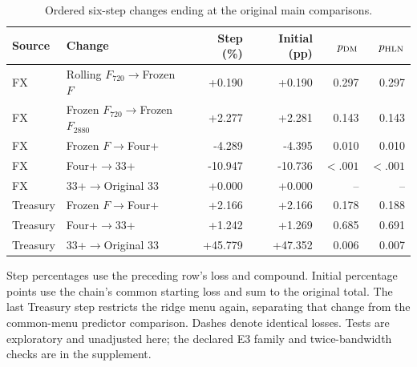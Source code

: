 \begin{table}[!htbp]
\centering\footnotesize
\caption{Ordered six-step changes ending at the original main comparisons.}\label{tab:decomp}
\begin{tabular}{llrrrr}
\toprule
Source & Change & Step (\%) & Initial (pp) & $p_{\rm DM}$ & $p_{\rm HLN}$ \\
\midrule
FX & Rolling $F_{720}$$\to$Frozen $F$ & +0.190 & +0.190 & 0.297 & 0.297 \\
FX & Frozen $F_{720}$$\to$Frozen $F_{2880}$ & +2.277 & +2.281 & 0.143 & 0.143 \\
FX & Frozen $F$$\to$Four+ & -4.289 & -4.395 & 0.010 & 0.010 \\
FX & Four+$\to$33+ & -10.947 & -10.736 & $<.001$ & $<.001$ \\
FX & 33+$\to$Original 33 & +0.000 & +0.000 & -- & -- \\
Treasury & Frozen $F$$\to$Four+ & +2.166 & +2.166 & 0.178 & 0.188 \\
Treasury & Four+$\to$33+ & +1.242 & +1.269 & 0.685 & 0.691 \\
Treasury & 33+$\to$Original 33 & +45.779 & +47.352 & 0.006 & 0.007 \\
\bottomrule
\end{tabular}
\par\smallskip\begin{minipage}{\linewidth}\footnotesize Step percentages use the preceding row's loss and compound. Initial percentage points use the chain's common starting loss and sum to the original total. The last Treasury step restricts the ridge menu again, separating that change from the common-menu predictor comparison. Dashes denote identical losses. Tests are exploratory and unadjusted here; the declared E3 family and twice-bandwidth checks are in the supplement.\end{minipage}
\end{table}
